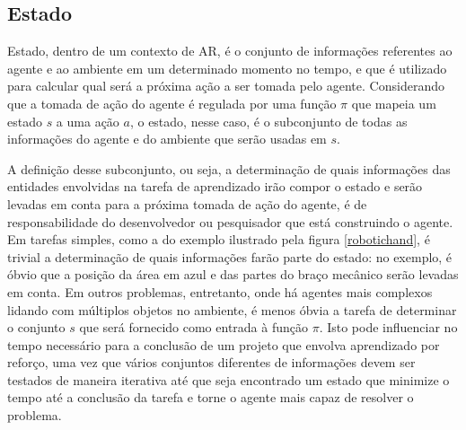 \documentclass[cic,tc]{iiufrgs}
\newcommand\bruno[1]{\textcolor{magenta}{#1}}
\begin{document}
\subsection{Estado}
Estado, dentro de um contexto de AR, é o conjunto de informações referentes ao agente e ao ambiente em um determinado momento no tempo, e que é utilizado para calcular
qual será a próxima ação a ser tomada pelo agente. Considerando que a tomada de ação do agente é regulada por uma função $\pi$ que mapeia um estado
$s$ a uma ação $a$, o estado, nesse caso, é o subconjunto de todas as informações do agente e do ambiente que serão usadas em $s$.



A definição desse subconjunto, ou seja, a determinação de quais informações das entidades envolvidas na tarefa de aprendizado irão compor o estado e serão
levadas em conta para a próxima tomada de ação do agente, é de responsabilidade do desenvolvedor ou pesquisador que está construindo
o agente. Em tarefas simples, como a do exemplo ilustrado pela figura \ref{robotichand}, é trivial a determinação de quais informações farão
parte do estado: no exemplo, é óbvio que a posição da área em azul e das partes do braço mecânico serão levadas em conta. Em outros
problemas, entretanto, onde há agentes mais complexos lidando com múltiplos objetos no ambiente, é menos óbvia a tarefa de determinar
o conjunto $s$ que será fornecido como entrada à função $\pi$. Isto pode influenciar no tempo necessário para a conclusão de um projeto
que envolva aprendizado por reforço, uma vez que vários conjuntos diferentes de informações devem ser testados de maneira iterativa
até que seja encontrado um estado que minimize o tempo até a conclusão da tarefa e torne o agente mais capaz de resolver o problema.
\end{document}
